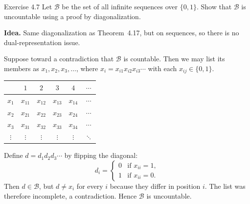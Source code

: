 \begin{question}{Exercise 4.7}
Let $\mathcal{B}$ be the set of all infinite sequences over $\{0,1\}$. Show that $\mathcal{B}$ is uncountable using a proof by diagonalization.
\end{question}
\begin{soln}
\textbf{Idea.} Same diagonalization as Theorem~4.17, but on sequences, so there is no dual-representation issue.

Suppose toward a contradiction that $\mathcal{B}$ is countable. Then we may list its members as $x_1,x_2,x_3,\dots$, where $x_i=x_{i1}x_{i2}x_{i3}\cdots$ with each $x_{ij}\in\{0,1\}$.

\begin{center}
\begin{tabular}{@{}c|ccccc@{}}
 & $1$ & $2$ & $3$ & $4$ & $\cdots$ \\
\midrule
$x_1$ & $x_{11}$ & $x_{12}$ & $x_{13}$ & $x_{14}$ & $\cdots$ \\
$x_2$ & $x_{21}$ & $x_{22}$ & $x_{23}$ & $x_{24}$ & $\cdots$ \\
$x_3$ & $x_{31}$ & $x_{32}$ & $x_{33}$ & $x_{34}$ & $\cdots$ \\
$\vdots$ & $\vdots$ & $\vdots$ & $\vdots$ & $\vdots$ & $\ddots$ \\
\end{tabular}
\end{center}

Define $d=d_1d_2d_3\cdots$ by flipping the diagonal:
\[
d_i=\begin{cases}
0 & \text{if }x_{ii}=1,\\
1 & \text{if }x_{ii}=0.
\end{cases}
\]
Then $d\in\mathcal{B}$, but $d\ne x_i$ for every $i$ because they differ in position $i$. The list was therefore incomplete, a contradiction. Hence $\mathcal{B}$ is uncountable.
\end{soln}

